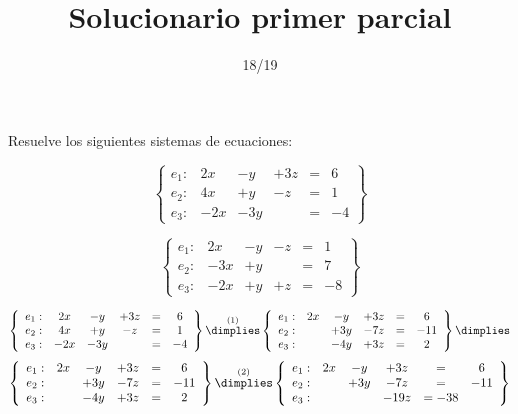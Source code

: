 \documentclass[palatino,nosec,nochap]{Docencia}
\title{Solucionario primer parcial}
\author{}
\date{18/19}
\newcommand\BackgroundPic{%
\put(0,0){%
\parbox[b][\paperheight]{\paperwidth}{%
\vfill
\centering
\vfill
}}}
\begin{document}
\pagestyle{plain}
\maketitle

\AddToShipoutPicture{\BackgroundPic}

\newpage

\begin{problem}

Resuelve los siguientes sistemas de ecuaciones:

\ppart
\[
\left\{\begin{array}{lccccc}
e_1: &	2x &	-	y &		+3z &	= & 6 \\
e_2: &	4x &	+	y &		-z &	= & 1 \\
e_3: &	-2x &	-  3y &		 &	= & -4 
\end{array}\right\}
\]


\ppart
\[
\left\{\begin{array}{lccccc}
e_1: &	2x &	-	y &		-z &	= & 1 \\
e_2: &	-3x &	+	y &		   &	= & 7 \\
e_3: &	-2x &	+   y &		+z&	= & -8 
\end{array}\right\}
\]

\solution

\spart

\[
\left\{\begin{array}{lccccc}
e_1: &	2x &	-	y &		+3z &	= & 6 \\
e_2: &	4x &	+	y &		-z &	= & 1 \\
e_3: &	-2x &	-  3y &		 &	= & -4 
\end{array}\right\}
\overset{(1)}{\dimplies}
\left\{\begin{array}{lccccc}
e_1: &	2x &	-	y &		+3z &	= & 6 \\
e_2: &	   &	+	3y &	-7z &	= & -11\\
e_3: &  &	 	-4y &	+3z &	= & 2\\
\end{array}\right\}
\dimplies\]
\[
\left\{\begin{array}{lccccc}
e_1: &	2x &	-	y &		+3z &	= & 6 \\
e_2: &	   &	+	3y &	-7z &	= & -11\\
e_3: &  &	 	-4y &	+3z &	= & 2\\
\end{array}\right\}
\overset{(2)}{\dimplies}
\left\{\begin{array}{lccccc}
e_1: &	2x &	-	y &		+3z &	= & 6 \\
e_2: &	   &	+	3y &	-7z &	= & -11\\
e_3: &	   &		   &	- 19z & = -38
\\
\end{array}\right\}
\]



\end{problem}
\end{document}
